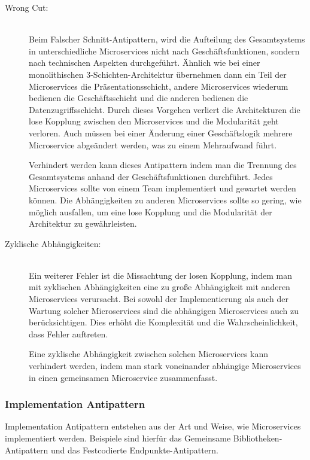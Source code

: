 \begin{description}
    \item[Wrong Cut:]\hfill \\
    Beim \glqq Falscher Schnitt\grqq{}-Antipattern, wird die Aufteilung des Gesamtsystems in unterschiedliche Microservices nicht nach Geschäftsfunktionen, sondern nach technischen Aspekten durchgeführt. Ähnlich wie bei einer monolithischen 3-Schichten-Architektur übernehmen dann ein Teil der Microservices die Präsentationsschicht, andere Microservices wiederum bedienen die Geschäftsschicht und die anderen bedienen die Datenzugriffsschicht. Durch dieses Vorgehen verliert die Architekturen die lose Kopplung zwischen den Microservices und die Modularität geht verloren. Auch müssen bei einer Änderung einer Geschäftslogik mehrere Microservice abgeändert werden, was zu einem Mehraufwand führt.

    Verhindert werden kann dieses Antipattern indem man die Trennung des Gesamtsystems anhand der Geschäftsfunktionen durchführt. Jedes Microservices sollte von einem Team implementiert und gewartet werden können. Die Abhängigkeiten zu anderen Microservices sollte so gering, wie möglich ausfallen, um eine lose Kopplung und die Modularität der Architektur zu gewährleisten.
    
    \item[Zyklische Abhängigkeiten:]\hfill \\
    Ein weiterer Fehler ist die Missachtung der losen Kopplung, indem man mit zyklischen Abhängigkeiten eine zu große Abhängigkeit mit anderen Microservices verursacht. Bei sowohl der Implementierung als auch der Wartung solcher Microservices sind die abhängigen Microservices auch zu berücksichtigen. Dies erhöht die Komplexität und die Wahrscheinlichkeit, dass Fehler auftreten.

    Eine zyklische Abhängigkeit zwischen solchen Microservices kann verhindert werden, indem man stark voneinander abhängige Microservices in einen gemeinsamen Microservice zusammenfasst. 

\end{description}

\subsubsection*{Implementation Antipattern}

Implementation Antipattern entstehen aus der Art und Weise, wie Microservices implementiert werden. Beispiele sind hierfür das \glqq Gemeinsame Bibliotheken\grqq{}-Antipattern und das \glqq Festcodierte Endpunkte\grqq{}-Antipattern.

